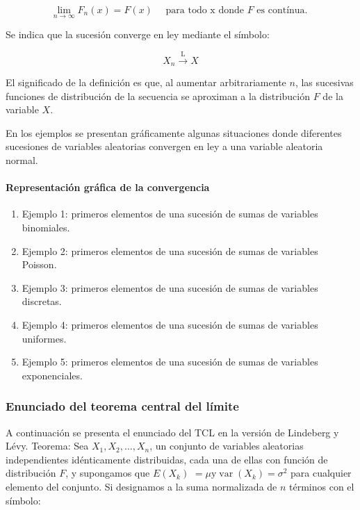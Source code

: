 \documentclass[
]{article}
\providecommand{\tightlist}{%
  \setlength{\itemsep}{0pt}\setlength{\parskip}{0pt}}
\begin{document}
\[
\lim _{n \rightarrow \infty} F_{n}(x)=F(x) \quad \text { para todo } \mathrm{x} \text { donde } F \text { es contínua. }
\]

Se indica que la sucesión converge en ley mediante el símbolo:

\[
X_{n} \stackrel{\mathrm{L}}{\rightarrow} X
\]

El significado de la definición es que, al aumentar arbitrariamente \(n\), las sucesivas funciones de distribución de la secuencia se aproximan a la distribución \(F\) de la variable \(X\).

En los ejemplos se presentan gráficamente algunas situaciones donde diferentes sucesiones de variables aleatorias convergen en ley a una variable aleatoria normal.

\paragraph{Representación gráfica de la convergencia}\label{representaciuxf3n-gruxe1fica-de-la-convergencia}

\begin{enumerate}
\def\labelenumi{\arabic{enumi}.}
\tightlist
\item
  Ejemplo 1: primeros elementos de una sucesión de sumas de variables binomiales.
\item
  Ejemplo 2: primeros elementos de una sucesión de sumas de variables Poisson.
\item
  Ejemplo 3: primeros elementos de una sucesión de sumas de variables discretas.
\item
  Ejemplo 4: primeros elementos de una sucesión de sumas de variables uniformes.
\item
  Ejemplo 5: primeros elementos de una sucesión de sumas de variables exponenciales.
\end{enumerate}

\subsubsection{Enunciado del teorema central del límite}\label{enunciado-del-teorema-central-del-luxedmite}

A continuación se presenta el enunciado del TCL en la versión de Lindeberg y Lévy.
Teorema:
Sea \(X_{1}, X_{2}, \ldots, X_{n}\), un conjunto de variables aleatorias independientes idénticamente distribuidas, cada una de ellas con función de distribución \(F\), y supongamos que \(E\left(X_{k}\right)\) \(=\mu \mathrm{y} \operatorname{var}\left(X_{k}\right)=\sigma^{2}\) para cualquier elemento del conjunto. Si designamos a la suma normalizada de \(n\) términos con el símbolo:
\end{document}
